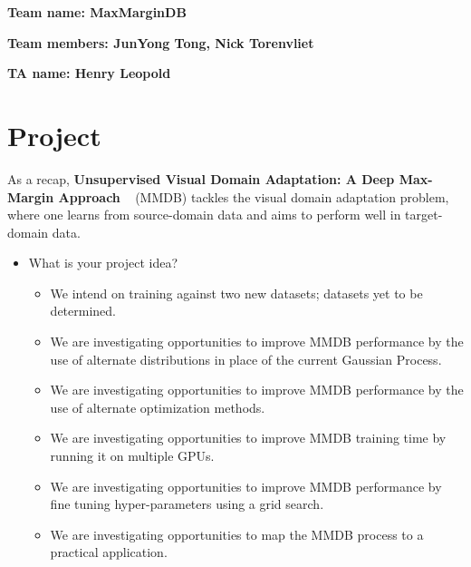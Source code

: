 \textbf{Team name: MaxMarginDB}

\textbf{Team members: JunYong Tong, Nick Torenvliet}

\textbf{TA name: Henry Leopold}

\section*{Project}
As a recap, \textbf{Unsupervised Visual Domain Adaptation: A Deep Max-Margin Approach} ~\cite{kim2019unsupervised} (MMDB) tackles the visual domain adaptation problem, where one learns from source-domain data and aims to perform well in target-domain data.
\begin{itemize}
    \item What is your project idea?
    \begin{itemize}
        \item We intend on training against two new datasets; datasets yet to be determined.
        \item We are investigating opportunities to improve MMDB performance by the use of alternate distributions in place of the current Gaussian Process.
        \item We are investigating opportunities to improve MMDB performance by the use of alternate optimization methods.
        \item We are investigating opportunities to improve MMDB training time by running it on multiple GPUs.
        \item We are investigating opportunities to improve MMDB performance by fine tuning hyper-parameters using a grid search. 
        \item We are investigating opportunities to map the MMDB process to a practical application.  
    \end{itemize}

\end{itemize}
